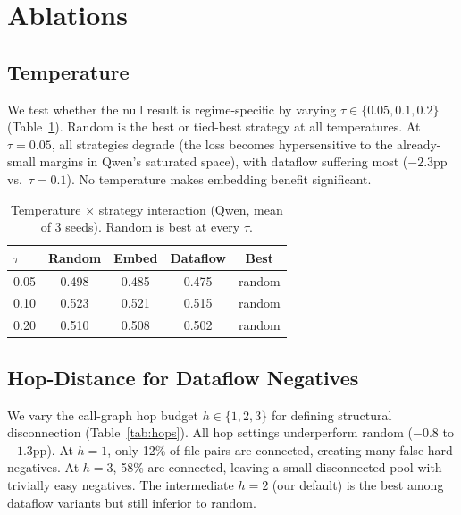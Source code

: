 \documentclass[11pt,a4paper]{article}
\begin{document}
\section{Ablations}
\label{sec:ablations}

\subsection{Temperature}

We test whether the null result is regime-specific by varying $\tau \in \{0.05, 0.1, 0.2\}$ (Table~\ref{tab:temperature}).
Random is the best or tied-best strategy at all temperatures.
At $\tau = 0.05$, all strategies degrade (the loss becomes hypersensitive to the already-small margins in Qwen's saturated space), with dataflow suffering most ($-2.3$pp vs.\ $\tau = 0.1$).
No temperature makes embedding benefit significant.

\begin{table}[t]
\centering
\small
\caption{Temperature $\times$ strategy interaction (Qwen, mean of 3 seeds). Random is best at every $\tau$.}
\label{tab:temperature}
\begin{tabular}{lcccc}
\toprule
$\tau$ & Random & Embed & Dataflow & Best \\
\midrule
0.05 & 0.498 & 0.485 & 0.475 & random \\
0.10 & 0.523 & 0.521 & 0.515 & random \\
0.20 & 0.510 & 0.508 & 0.502 & random \\
\bottomrule
\end{tabular}
\end{table}

\subsection{Hop-Distance for Dataflow Negatives}

We vary the call-graph hop budget $h \in \{1, 2, 3\}$ for defining structural disconnection (Table~\ref{tab:hops}).
All hop settings underperform random ($-0.8$ to $-1.3$pp).
At $h=1$, only 12\% of file pairs are connected, creating many false hard negatives.
At $h=3$, 58\% are connected, leaving a small disconnected pool with trivially easy negatives.
The intermediate $h=2$ (our default) is the best among dataflow variants but still inferior to random.
\end{document}
